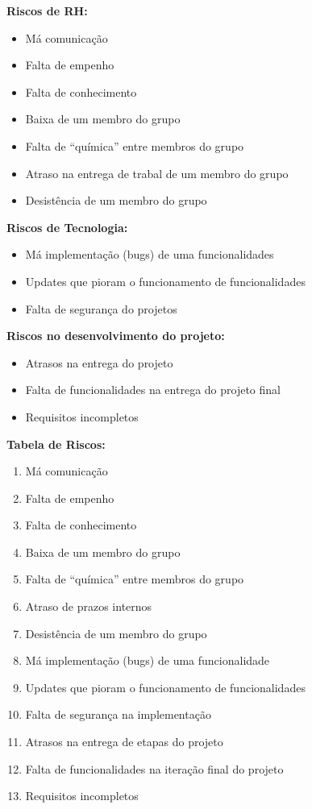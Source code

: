 \documentclass[12pt, a4paper, twoside]{report} %
\begin{document}
\clearpage
\noindent\textbf{Riscos de RH:}
\\
\begin{itemize}
\item Má comunicação
\item Falta de empenho
\item Falta de conhecimento
\item Baixa de um membro do grupo
\item Falta de “química” entre membros do grupo
\item Atraso na entrega de trabal de um membro do grupo
\item Desistência de um membro do grupo
\end{itemize}
\textbf{Riscos de Tecnologia:}
\\
\begin{itemize}
\item Má implementação (bugs) de uma funcionalidades
\item Updates que pioram o funcionamento de funcionalidades
\item Falta de segurança do projetos
\end{itemize}
\textbf{Riscos no desenvolvimento do projeto:}
\\
\begin{itemize}
\item Atrasos na entrega do projeto
\item Falta de funcionalidades na entrega do projeto final
\item Requisitos incompletos
\end{itemize}

\clearpage

\noindent\textbf{Tabela de Riscos:}

\begin{enumerate}
\item Má comunicação
\item Falta de empenho    
\item Falta de conhecimento 
\item Baixa de um membro do grupo
\item Falta de “química” entre membros do grupo
\item Atraso de prazos internos 
\item Desistência de um membro do grupo
\item Má implementação (bugs) de uma funcionalidade 
\item Updates que pioram o funcionamento de funcionalidades
\item Falta de segurança na implementação 
\item Atrasos na entrega de etapas do projeto
\item Falta de funcionalidades na iteração final do projeto
\item Requisitos incompletos
\end{enumerate}
\end{document}
